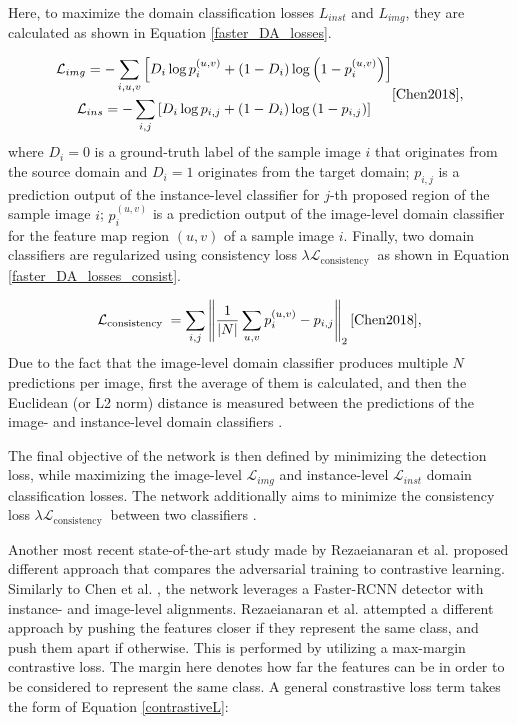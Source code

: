 \documentclass[english, 12pt, a4paper, elec, utf8, a-1b, online]{aaltothesis}
\begin{document}
Here, to maximize the domain classification losses $L_{inst}$ and $L_{img}$, they are calculated as shown in Equation \ref{faster_DA_losses}. 

\begin{equation}
\label{faster_DA_losses} 
\begin{gathered}
\mathcal{L}_{i m g}=-\sum_{i, u, v}\left[D_{i} \log p_{i}^{(u, v)}+\left(1-D_{i}\right) \log \left(1-p_{i}^{(u, v)}\right)\right] \\ 
\mathcal{L}_{i n s} = -\sum_{i, j}\left[D_{i} \log p_{i, j}+\left(1-D_{i}\right) \log \left(1-p_{i, j}\right)\right]
\end{gathered}
\cite{Chen2018}, 
\end{equation}
where $D_i=0$ is a ground-truth label of the sample image $i$ that originates from  the source domain and $D_i=1$ originates from the target domain; $p_{i,j}$ is a prediction output of the instance-level classifier for $j$-th proposed region of the sample image $i$; $p_{i}^{(u, v)}$ is a prediction output of the image-level domain classifier for the feature map region $(u,v)$ of a sample image $i$. 
Finally, two domain classifiers are regularized using consistency loss $\lambda \mathcal{L}_{\text {consistency }}$ as shown in Equation \ref{faster_DA_losses_consist}.  

\begin{equation}
\label{faster_DA_losses_consist} 
\mathcal{L}_{\text {consistency }}=\sum_{i, j}\left\|\frac{1}{|N|} \sum_{u, v} p_{i}^{(u, v)}-p_{i, j}\right\|_{2}
\cite{Chen2018}, 
\end{equation}
Due to the fact that the image-level domain classifier produces multiple $N$ predictions per image, first the average of them is calculated, and then the Euclidean (or L2 norm) distance is measured between the predictions of the image- and instance-level domain classifiers \cite{Chen2018}. 

The final objective of the network is then defined by minimizing the detection loss, while maximizing the image-level $\mathcal{L}_{img}$ and instance-level $\mathcal{L}_{inst}$ domain classification losses. The network additionally aims to minimize the consistency loss $\lambda \mathcal{L}_{\text {consistency }}$ between two classifiers \cite{Chen2018}.

Another most recent state-of-the-art study made by Rezaeianaran et al. \cite{Rezaeianaran2021} proposed different approach that compares the adversarial training to contrastive learning. Similarly to Chen et al. \cite{Chen2018}, the network leverages a Faster-RCNN detector with instance- and image-level alignments. Rezaeianaran et al. attempted a different approach by pushing the features closer if they represent the same class, and push them apart if otherwise. This is performed by utilizing a max-margin contrastive loss. The margin here denotes how far the features can be in order to be considered to represent the same class. A general constrastive loss term takes the form of Equation \ref{contrastiveL}:
\end{document}
